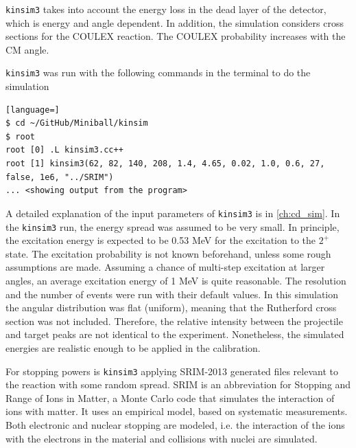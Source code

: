 \documentclass[twoside,english]{uiofysmaster/uiofysmaster}
\newcommand{\Sm}{$^{140}$Sm} %
\let\orgautoref\autoref
\renewcommand{\autoref}
        {%
		 \def\sectionautorefname{Section}%
		 \def\subsectionautorefname{Section}%
		 \def\subsubsectionautorefname{Section}%
		 \def\chapterautorefname{Chapter}%
          \orgautoref}
\begin{document}
\texttt{kinsim3} takes into account the energy loss in the dead layer of the detector, which is energy and angle dependent. 
In addition, the simulation considers cross sections for the COULEX reaction. 
The COULEX probability increases with the CM angle.

\texttt{kinsim3} was run with the following commands in the terminal to do the simulation
\begin{lstlisting}[language=]
$ cd ~/GitHub/Miniball/kinsim
$ root
root [0] .L kinsim3.cc++
root [1] kinsim3(62, 82, 140, 208, 1.4, 4.65, 0.02, 1.0, 0.6, 27, false, 1e6, "../SRIM")
... <showing output from the program>
\end{lstlisting}
A detailed explanation of the input parameters of \texttt{kinsim3} is in \autoref{ch:cd_sim}.
In the \texttt{kinsim3} run, the energy spread was assumed to be very small. 
In principle, the excitation energy is expected to be 0.53 MeV for the excitation to the $2^+$ state. 
The excitation probability is not known beforehand, unless some rough assumptions are made.
Assuming a chance of multi-step excitation at larger angles, an average excitation energy of 1 MeV is quite reasonable.
The resolution and the number of events were run with their default values.
In this simulation the angular distribution was flat (uniform), meaning that the Rutherford cross section was not included. 
Therefore, the relative intensity between the projectile and target peaks are not identical to the experiment.
Nonetheless, the simulated energies are realistic enough to be applied in the calibration.

For stopping powers is \texttt{kinsim3} applying SRIM-2013 \cite{SRIM} generated files relevant to the reaction with some random spread.
SRIM is an abbreviation for Stopping and Range of Ions in Matter, a Monte Carlo code that simulates the interaction of ions with matter.
It uses an empirical model, based on systematic measurements. 
Both electronic and nuclear stopping are modeled, i.e. the interaction of the ions with the electrons in the material and collisions with nuclei are simulated.


%
%	
\end{document}

